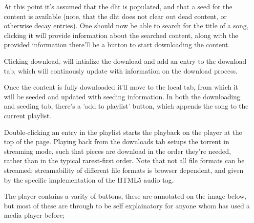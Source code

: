At this point it's assumed that the dht is populated, and that a seed for the
content is available (note, that the dht does not clear out dead content, or
otherwise decay entries). One should now be able to search for the title of a 
song, clicking it will provide information about the searched content, along 
with the provided information there'll be a button to start downloading the 
content.

Clicking download, will intialize the download and add an entry to the download
tab, which will continously update with information on the download process.

Once the content is fully downloaded it'll move to the local tab, from which it
will be seeded and updated with seeding information. In both the downloading 
and seeding tab, there's a 'add to playlist' button, which appends the song to
the current playlist.

Double-clicking an entry in the playlist starts the playback on the player at
the top of the page. Playing back from the downloads tab setups the torrent in
streaming mode, such that pieces are download in the order they're needed,
rather than in the typical rarest-first order. Note that not all file formats
can be streamed; streamability of different file formats is browser dependent,
and given by the specific implementation of the HTML5 audio tag.

The player contains a varity of buttons, these are annotated on the image below,
but most of these are through to be self explainatory for anyone whom has used
a media player before;

